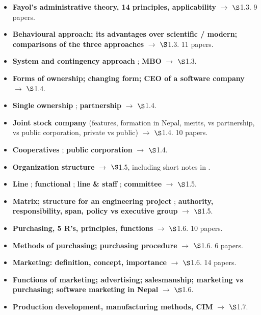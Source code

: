 \begin{itemize}
  \item \textbf{Fayol's administrative theory, 14 principles, applicability} $\rightarrow$
    $\S$1.3. 9 papers.
  \item \textbf{Behavioural approach; its advantages over scientific / modern; comparisons of
    the three approaches} $\rightarrow$ $\S$1.3. 11 papers.
  \item \textbf{System and contingency approach} ; \textbf{MBO}  $\rightarrow$ $\S$1.3.
  \item \textbf{Forms of ownership; changing form; CEO of a software company}
    $\rightarrow$ $\S$1.4. 
  \item \textbf{Single ownership} ;
    \textbf{partnership}  $\rightarrow$
    $\S$1.4.
  \item \textbf{Joint stock company} (features, formation in Nepal, merits, vs partnership,
    vs public corporation, private vs public) $\rightarrow$ $\S$1.4. 10 papers.
  \item \textbf{Cooperatives} ;
    \textbf{public corporation}  $\rightarrow$ $\S$1.4.
  \item \textbf{Organization structure} $\rightarrow$ $\S$1.5, including short notes in
    .
  \item \textbf{Line} ;
    \textbf{functional} ;
    \textbf{line \& staff} ;
    \textbf{committee}  $\rightarrow$ $\S$1.5.
  \item \textbf{Matrix; structure for an engineering project} ; \textbf{authority, responsibility, span, policy vs executive group}
     $\rightarrow$ $\S$1.5.
  \item \textbf{Purchasing, 5 R's, principles, functions} $\rightarrow$ $\S$1.6. 10 papers.
  \item \textbf{Methods of purchasing; purchasing procedure} $\rightarrow$ $\S$1.6. 6 papers.
  \item \textbf{Marketing: definition, concept, importance} $\rightarrow$ $\S$1.6. 14 papers.
  \item \textbf{Functions of marketing; advertising; salesmanship; marketing vs purchasing;
    software marketing in Nepal} $\rightarrow$ $\S$1.6.
  \item \textbf{Production development, manufacturing methods, CIM} $\rightarrow$ $\S$1.7.
\end{itemize}


